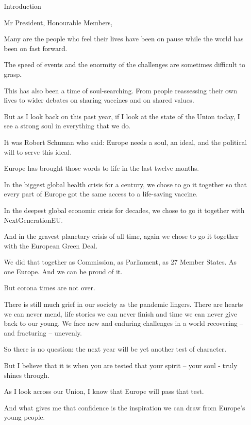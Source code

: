 \documentclass[a4paper,11pt]{article}
\begin{document}
 

Introduction

 

Mr President,
Honourable Members,

Many are the people who feel their lives have been on pause while the world has been on fast forward.

The speed of events and the enormity of the challenges are sometimes difficult to grasp.

This has also been a time of soul-searching. From people reassessing their own lives to wider debates on sharing vaccines and on shared values.

But as I look back on this past year, if I look at the state of the Union today, I see a strong soul in everything that we do.

It was Robert Schuman who said: Europe needs a soul, an ideal, and the political will to serve this ideal.

Europe has brought those words to life in the last twelve months.

In the biggest global health crisis for a century, we chose to go it together so that every part of Europe got the same access to a life-saving vaccine.

In the deepest global economic crisis for decades, we chose to go it together with NextGenerationEU.

And in the gravest planetary crisis of all time, again we chose to go it together with the European Green Deal.

We did that together as Commission, as Parliament, as 27 Member States. As one Europe. And we can be proud of it.

But corona times are not over.

There is still much grief in our society as the pandemic lingers. There are hearts we can never mend, life stories we can never finish and time we can never give back to our young. We face new and enduring challenges in a world recovering – and fracturing – unevenly. 

So there is no question: the next year will be yet another test of character.

But I believe that it is when you are tested that your spirit – your soul - truly shines through.

As I look across our Union, I know that Europe will pass that test.

And what gives me that confidence is the inspiration we can draw from Europe's young people.
\end{document}
